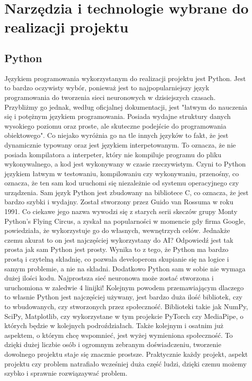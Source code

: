 \documentclass[12pt]{article}
\begin{document}
\begin{sloppypar}
\section{Narzędzia i technologie wybrane do realizacji projektu}
{
  \subsection{Python}
  {
    Językiem programowania wykorzystanym do realizacji projektu jest Python. 
    Jest to bardzo oczywisty wybór, ponieważ jest to najpopularniejszy język programowania do tworzenia sieci neuronowych w dzisiejszych czasach.
    Przybliżmy go jednak, według oficjalnej dokumentacji, jest "łatwym do nauczenia się i potężnym językiem programowania. 
    Posiada wydajne struktury danych wysokiego poziomu oraz proste, ale skuteczne podejście do programowania obiektowego"\cite{python-docs}.
    Co niejako wyróżnia go na tle innych języków to fakt, że jest dynamicznie typowany oraz jest językiem interpetowanym. 
    To oznacza, że nie posiada kompilatora a interpeter, który nie kompiluje programu do pliku wykonywalnego, a kod jest wykonywany w czasie rzeczywistym.
    Czyni to Python językiem łatwym w testowaniu, kompilowaniu czy wykonywaniu, przenośny, co oznacza, że ten sam kod uruchomi się niezależnie od systemu operacyjnego czy urządzenia.
    Sam język Python jest zbudowany na bibliotece C, co oznacza, że jest bardzo szybki i wydajny. 
    Został stworzony przez Guido van Rossuma w roku 1991.
    Co ciekawe jego nazwa wywodzi się z starych serii skeczów grupy Monty Python’s Flying Circus, 
    a zyskał na popularności w momencie gdy firma Google, powiedziała, że wykorzystuje go do własnych, wewnętrzych celów.
    \newline
    Jednakże czemu akurat to on jest najczęściej wykorzystany do AI? Odpowiedź jest tak prosta jak sam Python jest prosty.
    Wynika to z tego, że Python ma bardzo prostą i czytelną składnię, co pozwala developerom skupianie się na logice i samym problemie, a nie na składni\cite{python-ai}.
    Dodatkowo Python sam w sobie nie wymaga dużej ilości kodu. Najprostsza sieć neuronowa może zostać stworzona i uruchomiona w zaledwie 4 linijki!
    Kolejnym powodem przemawiającym dlaczego to własnie Python jest najczęściej używany, 
    jest bardzo duża ilość bibliotek, czy to wbudowanych, czy stworzonych przez społeczność. 
    Biblioteki takie jak NumPy, SciPy, Matplotlib, czy wykorzystane w tym projekcie PyTorch czy MediaPipe, o których będzie w kolejnych podroździałach.
    Także kolejnym i osatnim już aspektem, o którym chcę wspomnieć, jest wyżej wymieniona społeczność. 
    To dzięki dużej liczbie osób i ogromnym zebranym doświadczeniu, tworzenie dowolnego projektu staje się znacznie prostsze. 
    Praktycznie każdy projekt, aspekt projektu czy problem natrafiało wcześniej duża część ludzi, dzięki czemu możemy szybko i sprawnie rozwiązaywać problem.
  }
}
\end{sloppypar}
\end{document}
